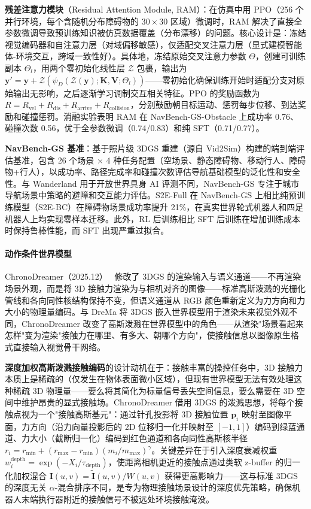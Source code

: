 \textbf{残差注意力模块}（Residual Attention Module, RAM）：在仿真中用 PPO（256 个并行环境，每个含随机分布障碍物的 $30 \times 30$ 区域）微调时，RAM 解决了直接全参数微调导致预训练知识被仿真数据覆盖（分布漂移）的问题。核心设计是：冻结视觉编码器和自注意力层（对域偏移敏感），仅适配交叉注意力层（显式建模智能体-环境交互，跨域一致性好）。具体地，冻结原始交叉注意力参数 $\Theta$，创建可训练副本 $\Theta_l$，用两个零初始化线性层 $\mathcal{Z}$ 包裹，输出为 $\bm{y}' = \bm{y} + \mathcal{Z}(\psi_D(\mathcal{Z}(\bm{y}); \bm{K}, \bm{V}; \Theta_l))$——零初始化确保训练开始时适配分支对原始输出无影响，之后逐渐学习调制交互相关特征。PPO 的奖励函数为 $R = R_\text{vel} + R_\text{dis} + R_\text{arrive} + R_\text{collision}$，分别鼓励朝目标运动、惩罚每步位移、到达奖励和碰撞惩罚。消融实验表明 RAM 在 NavBench-GS-Obstacle 上成功率 0.76、碰撞次数 0.56，优于全参数微调（0.74/0.83）和纯 SFT（0.71/0.77）。

\textbf{NavBench-GS 基准}：基于照片级 3DGS 重建（源自 Vid2Sim）构建的端到端评估基准，包含 26 个场景 $\times$ 4 种任务配置（空场景、静态障碍物、移动行人、障碍物+行人），以成功率、路径完成率和碰撞次数评估导航基础模型的泛化性和安全性。与 Wanderland 用于开放世界具身 AI 评测不同，NavBench-GS 专注于城市导航场景中策略的避障和交互能力评估。S2E-Full 在 NavBench-GS 上相比纯预训练模型（S2E-BC）在障碍物场景成功率提升 21\%，在真实世界轮式机器人和四足机器人上均实现零样本迁移。此外，RL 后训练相比 SFT 后训练在增加训练成本时保持鲁棒性能，而 SFT 出现严重过拟合。

\paragraph{动作条件世界模型}

ChronoDreamer（2025.12）~\cite{2512_18619} 修改了 3DGS 的渲染输入与语义通道——不再渲染场景外观，而是将 3D 接触力渲染为与相机对齐的图像——标准高斯泼溅的光栅化管线和各向同性核结构保持不变，但语义通道从 RGB 颜色重新定义为力方向和力大小的物理量编码。与 DreMa 将 3DGS 嵌入世界模型用于渲染未来视觉外观不同，ChronoDreamer 改变了高斯泼溅在世界模型中的角色——从渲染"场景看起来怎样"变为渲染"接触力在哪里、有多大、朝哪个方向"，使接触信息以图像原生格式直接输入视觉骨干网络。

\textbf{深度加权高斯泼溅接触编码}的设计动机在于：接触丰富的操控任务中，3D 接触力本质上是稀疏的（仅发生在物体表面微小区域），但现有世界模型无法有效处理这种稀疏 3D 物理量——要么将其简化为标量信号丢失空间信息，要么需要在 3D 空间中维护昂贵的显式接触场。ChronoDreamer 借用 3DGS 的泼溅思想，将每个接触点视为一个"接触高斯基元"：通过针孔投影将 3D 接触位置 $\mathbf{p}_i$ 映射至图像平面，力方向（沿力向量投影后的 2D 位移归一化并映射至 $[-1,1]$）编码到绿蓝通道、力大小（截断归一化）编码到红色通道和各向同性高斯核半径 $r_i = r_{\min} + (r_{\max} - r_{\min})(m_i/m_{\max})^\gamma$。关键差异在于引入深度衰减权重 $w_i^{\text{depth}} = \exp(-X_i / \tau_{\text{depth}})$，使距离相机更近的接触点通过类软 z-buffer 的归一化加权混合 $\mathbf{I}(u,v) = \tilde{\mathbf{I}}(u,v) / W(u,v)$ 获得更高影响力——这与标准 3DGS 的深度无关 $\alpha$-混合排序不同，是专为物理接触场景设计的深度优先策略，确保机器人末端执行器附近的接触信号不被远处环境接触淹没。

